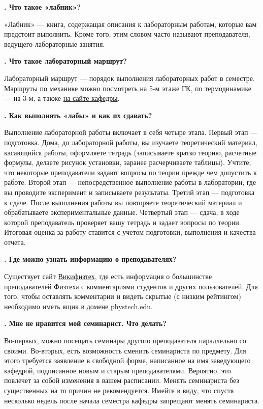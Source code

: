 \documentclass[14pt]{extarticle}
\newcounter{question}
\newcommand\Que[1]{%
    \begin{minipage}{\textwidth}
    \leavevmode\par
    \stepcounter{question}
    \noindent
    {\large\textbf{\thequestion. #1}}\par}
\newcommand\Ans[2][]{%
    \leavevmode\par\noindent
    {\leftskip37pt
    \textbf{#1}#2\par}
    \end{minipage}}
\begin{document}
\Que{Что такое «лабник»?}
\Ans{«Лабник» — книга, содержащая описания к лабораторным работам, которые вам предстоит выполнить. Кроме того, этим словом часто называют преподавателя, ведущего лабораторные занятия.}

\Que{Что такое лабораторный маршрут?}
\Ans{Лабораторный маршрут — порядок выполнения лабораторных работ в семестре. Маршруты по механике можно посмотреть на 5-м этаже ГК, по термодинамике — на 3-м, а также \href{https://mipt.ru/education/chair/physics/S_I/lab/}{на сайте кафедры}.}

\Que{Как выполнять «лабы» и как их сдавать?}
\Ans{Выполнение лабораторной работы включает в себя четыре этапа. Первый этап — подготовка. Дома, до лабораторной работы, вы изучаете теоретический материал, касающийся работы, оформляете тетрадь (записываете кратко теорию, расчетные формулы, делаете рисунок установки, заранее расчерчиваете таблицы). Учтите, что некоторые преподаватели задают вопросы по теории прежде чем допустить к работе. Второй этап — непосредственное выполнение работы в лаборатории, где вы проводите эксперимент и записываете результаты. Третий этап — подготовка к сдаче. После выполнения работы вы повторяете теоретический материал и обрабатываете экспериментальные данные. Четвертый этап — сдача, в ходе которой преподаватель проверяет вашу тетрадь и задает вопросы по теории. Итоговая оценка за работу ставится с учетом подготовки, выполнения и качества отчета.}

\Que{Где можно узнать информацию о преподавателях?}
\Ans{Существует сайт \href{http://wikimipt.org}{Викифизтех}, где есть информация о большинстве преподавателей Физтеха с комментариями студентов и других пользователей. Для того, чтобы оставлять комментарии и видеть скрытые (с низким рейтингом) необходимо иметь ящик в домене phystech.edu.}

\Que{Мне не нравится мой семинарист. Что делать?}
\Ans{Во-первых, можно посещать семинары другого преподавателя параллельно со своими. Во-вторых, есть возможность сменить семинариста по предмету. Для этого требуется заявление в свободной форме, написанное на имя заведующего кафедрой, подписанное новым и старым преподавателями. Вероятно, это повлечет за собой изменения в вашем расписании. Менять семинариста без существенных на то причин не рекомендуется. Имейте в виду, что спустя несколько недель после начала семестра кафедры запрещают менять семинариста.}
\end{document}
